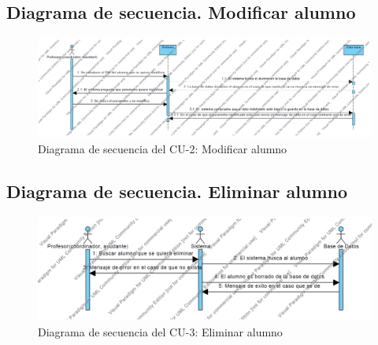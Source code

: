 \newpage
\subsection{Diagrama de secuencia. Modificar alumno}
\begin{figure}[h!]
	\centering
	\includegraphics[width=1\textwidth]{../design/sd-2}
	\caption{Diagrama de secuencia del CU-2: Modificar alumno}
	\label{fig:sd002}
\end{figure}

\subsection{Diagrama de secuencia. Eliminar alumno}
\begin{figure}[h!]
	\centering
	\includegraphics[width=1\textwidth]{../design/sd-3}
	\caption{Diagrama de secuencia del CU-3: Eliminar alumno}
	\label{fig:sd003}
\end{figure}

\newpage
